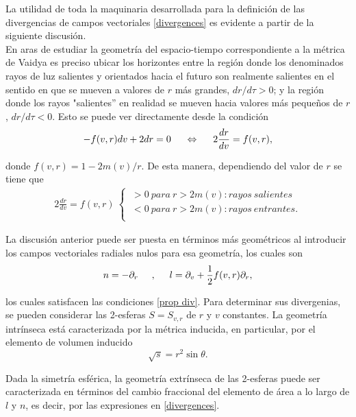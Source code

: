 \documentclass[16pt,a4paper]{article}
\numberwithin{equation}{section}
\theoremstyle{definition}
\begin{document}
La utilidad de toda la maquinaria desarrollada para la definición de las divergencias de campos vectoriales \eqref{divergences} es evidente a partir de la siguiente discusión.\\

En aras de estudiar la geometría del espacio-tiempo correspondiente a la métrica de Vaidya es preciso ubicar los horizontes entre la región donde los denominados rayos de luz salientes y orientados hacia el futuro son realmente salientes en el sentido en que se mueven a valores de $r$ más grandes, $dr/d\tau >0$; y la región donde los rayos "salientes'' en realidad se mueven hacia valores más pequeños de $r$, $dr/d\tau <0$. Esto se puede ver directamente desde la condición
\begin{equation*}
-f(v,r)dv + 2dr = 0 \hspace{.5cm} \Leftrightarrow \hspace{.5cm} 2\frac{dr}{dv} = f(v,r),
\end{equation*}

donde $f(v,r) = 1 - 2m(v)/r$. De esta manera, dependiendo del valor de $r$ se tiene que
\begin{align*}
2\frac{dr}{dv} = f(v,r)\ 
\begin{cases}
\ > 0\ para\ r > 2m(v): rayos\  salientes\\  
\ < 0\ para\ r > 2m(v): rayos\  entrantes.\\
\end{cases}
\end{align*}

La discusión anterior puede ser puesta en términos más geométricos al introducir los campos vectoriales radiales nulos para esa geometría, los cuales son
\begin{equation*}
n = -\partial_r \hspace{.5cm},\hspace{.5cm} l = \partial_v + \frac{1}{2}f(v,r)\partial_r,
\end{equation*}

los cuales satisfacen las condiciones \eqref{prop div}. Para determinar sus divergenias, se pueden considerar las 2-esferas $S = S_{v,r}$ de $r$ y $v$ constantes. La geometría intrínseca está caracterizada por la métrica inducida, en particular, por el elemento de volumen inducido
\begin{equation*}
\sqrt{s} = r^2 \sin \theta.
\end{equation*}

Dada la simetría esférica, la geometría extrínseca de las 2-esferas puede ser caracterizada en términos del cambio fraccional del elemento de área a lo largo de $l$ y $n$, es decir, por las expresiones en \eqref{divergences}.\\
\end{document}
